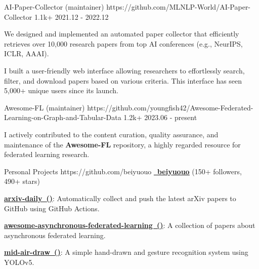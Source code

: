 \begin{cventries}

\cvproject
{AI-Paper-Collector (maintainer)} %
{https://github.com/MLNLP-World/AI-Paper-Collector}
{1.1k+} %
{2021.12 - 2022.12} %
{
\begin{cvitems} %
\item {We designed and implemented an automated paper collector that efficiently retrieves over 10,000 research papers from top AI conferences (e.g., NeurIPS, ICLR, AAAI).}
\item {I built a user-friendly web interface allowing researchers to effortlessly search, filter, and download papers based on various criteria. This interface has seen 5,000+ unique users since its launch.}
\end{cvitems}
} %


\cvproject
{Awesome-FL (maintainer)} %
{https://github.com/youngfish42/Awesome-Federated-Learning-on-Graph-and-Tabular-Data}
{1.2k+} %
{2023.06 - present} %
{
\begin{cvitems} %
\item {I actively contributed to the content curation, quality assurance, and maintenance of the \textbf{Awesome-FL} repository, a highly regarded resource for federated learning research. }
\end{cvitems}
} %



\cvproject
{Personal Projects} %
{https://github.com/beiyuouo} %
{} %
{\href{https://github.com/beiyuouo}{\textcolor{text}{\faGithub~\textbf{\underline{beiyuouo}}}} (150+ followers, 490+ stars)} %
{
\begin{cvitems} %
\item {\href{https://github.com/beiyuouo/arxiv-daily}{\textbf{arxiv-daily~()}}: Automatically collect and push the latest arXiv papers to GitHub using GitHub Actions.}
\item {\href{https://github.com/beiyuouo/awesome-asynchronous-federated-learning}{\textbf{awesome-asynchronous-federated-learning~()}}: A collection of papers about asynchronous federated learning.}
\item {\href{https://github.com/beiyuouo/mid-air-draw}{\textbf{mid-air-draw~()}}: A simple hand-drawn and gesture recognition system using YOLOv5.}
\end{cvitems}
} %


\end{cventries}
